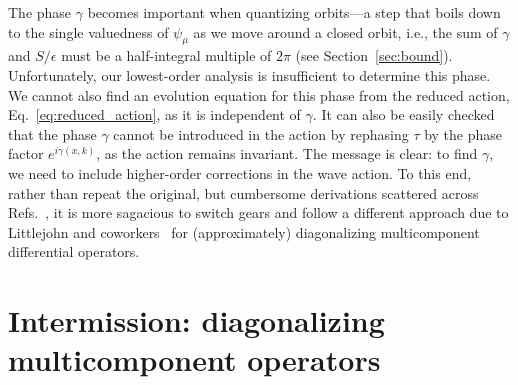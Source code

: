 The phase $\gamma$ becomes important when quantizing orbits---a step that boils down to the single valuedness of $\psi_{\mu}$ as we move around a closed orbit, i.e., the sum of $\gamma$ and $S/\epsilon$ must be a half-integral multiple of $2\pi$ (see Section~\ref{sec:bound}).
Unfortunately, our lowest-order analysis is insufficient to determine this phase.
We cannot also find an evolution equation for this phase from the reduced action, Eq.~\eqref{eq:reduced_action}, as it is independent of $\gamma$.
It can also be easily checked that the phase $\gamma$ cannot be introduced in the action by rephasing $\tau$ by the phase factor $e^{i\gamma(x,k)}$, as the action remains invariant.
The message is clear: to find $\gamma$, we need to include higher-order corrections in the wave action.
To this end, rather than repeat the original, but cumbersome derivations scattered across Refs.~\cite{bernstein1975,berk1980,yabana1986,kaufman1987}, it is more sagacious to switch gears and follow a different approach due to Littlejohn and coworkers~\cite{littlejohn1991,littlejohn1991a} for (approximately) diagonalizing multicomponent differential operators.


\section{Intermission: diagonalizing multicomponent operators}
\label{sec:diagonalize}


